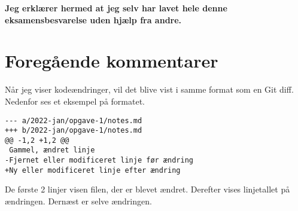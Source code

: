 \documentclass[12pt, oneside]{book}
\begin{document}
\begin{titlepage}
    
\end{titlepage}

\pagestyle{fancy}


\tableofcontents

\newpage

\begin{mdframed}
\bfseries
Jeg erklærer hermed at jeg selv har lavet hele denne eksamensbesvarelse uden hjælp fra andre.
\end{mdframed}

\setcounter{section}{-1}
\section{Foregående kommentarer}

Når jeg viser kodeændringer, vil det blive vist i samme format som en Git diff. Nedenfor ses et eksempel på formatet.

\begin{verbatim}
--- a/2022-jan/opgave-1/notes.md
+++ b/2022-jan/opgave-1/notes.md
@@ -1,2 +1,2 @@
 Gammel, ændret linje
-Fjernet eller modificeret linje før ændring
+Ny eller modificeret linje efter ændring
\end{verbatim}

De første 2 linjer visen filen, der er blevet ændret. Derefter vises linjetallet på ændringen. Dernæst er selve ændringen.




\end{document}
